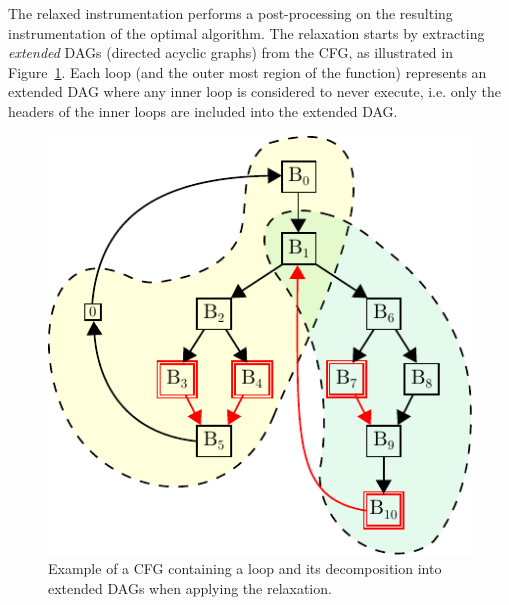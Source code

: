 \documentclass[sigplan,9pt]{acmart}
\begin{document}


The relaxed instrumentation performs a post-processing on the resulting instrumentation of the optimal algorithm.
The relaxation starts by extracting \textit{extended} DAGs (directed acyclic graphs) from the CFG, as illustrated in Figure~\ref{fig:cfg-relax-example}.
Each loop (and the outer most region of the function) represents an extended DAG where any inner loop is considered to never execute, i.e. only the headers of the inner loops are included into the extended DAG.

%
%

\begin{figure}[h]
  \centering
  \includegraphics[scale=0.9]{figs/cfg-relax-example.pdf}
  \caption{Example of a CFG containing a loop and its decomposition into extended DAGs when applying the relaxation.}
  \label{fig:cfg-relax-example}
\end{figure}
\end{document}
